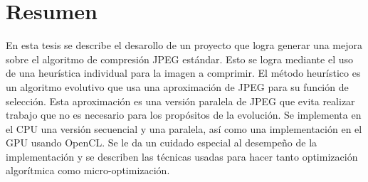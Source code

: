 \begingroup
\let\clearpage\relax
\let\cleardoublepage\relax
\let\cleardoublepage\relax

\chapter*{Resumen}

En esta tesis se describe el desarollo de un proyecto que logra generar una
mejora sobre el algoritmo de compresión JPEG estándar. Esto se logra mediante
el uso de una heurística individual para la imagen a comprimir. El método
heurístico es un \gls{algoritmo evolutivo} que usa una aproximación de JPEG
para su función de selección. Esta aproximación es una versión paralela de JPEG
que evita realizar trabajo que no es necesario para los propósitos de la
evolución. Se implementa en el CPU una versión secuencial y una paralela, así
como una implementación en el GPU usando OpenCL. Se le da un cuidado especial
al desempeño de la implementación y se describen las técnicas usadas para hacer
tanto optimización algorítmica como micro-optimización.


\vfill

\endgroup

